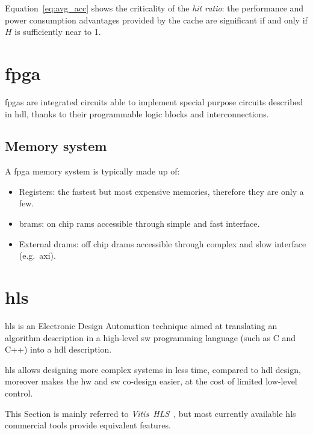 \documentclass[11pt,a4paper,oneside]{memoir}
\begin{document}
Equation~\ref{eq:avg_acc} shows the criticality of the \emph{hit ratio}: the
performance and power consumption advantages provided by the cache are
significant if and only if $H$ is sufficiently near to 1.

\section{\acl{fpga}}
\aclp{fpga} are integrated circuits able to implement special purpose circuits
described in \ac{hdl}, thanks to their programmable logic blocks and
interconnections.
\subsection{Memory system}
A \ac{fpga} memory system is typically made up of:
\begin{itemize}
	\item Registers: the fastest but most expensive memories, therefore
		they are only a few.
	\item \acp{bram}: on chip \acp{ram} accessible through simple and fast
		interface.
	\item External \acp{dram}: off chip \acp{dram} accessible through
		complex and slow interface (e.g.\ \acs{axi}).
\end{itemize}

\section{\acl{hls}}
\acf{hls} is an Electronic Design Automation technique aimed at translating an
algorithm description in a high-level \acl{sw} programming language (such as C
and C++) into a \ac{hdl} description.

\ac{hls} allows designing more complex systems in less time, compared to
\ac{hdl} design, moreover makes the \acl{hw} and \acl{sw} co-design easier, at
the cost of limited low-level control.

This Section is mainly referred to
\emph{Vitis\texttrademark~HLS}~\cite{vitisug}, but most currently available
\ac{hls} commercial tools provide equivalent features.
\end{document}
